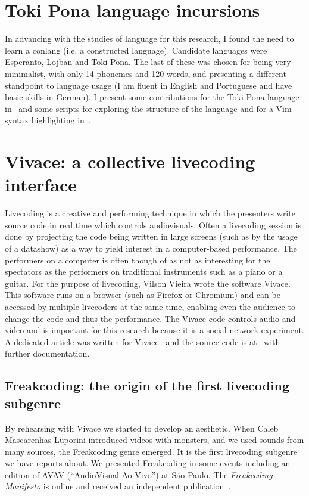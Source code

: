 \begin{apendicesenv}
\section{Toki Pona language incursions}
In advancing with the studies of language for this research,
I found the need to learn a conlang (i.e. a constructed language).
Candidate languages were Esperanto, Lojban and Toki Pona.
The last of these was chosen for being very minimalist,
with only 14 phonemes and 120 words,
and presenting a different standpoint to language usage
(I am fluent in English and Portuguese and have basic skills in German).
I present some contributions for the Toki Pona language in~\cite{tokiio}
and some scripts for exploring the structure of the language and for
a Vim syntax highlighting in~\cite{tokir}.

\section{Vivace: a collective livecoding interface}\label{sec:vivace}
Livecoding is a creative and performing technique in which the
presenters write source code in real time which controls audiovisuals.
Often a livecoding session is done by projecting the code being written in
large screens (such as by the usage of a datashow) as a way to yield
interest in a computer-based performance.
The performers on a computer is often though of as not as interesting
for the spectators as the performers on traditional instruments such as a piano or a guitar.
For the purpose of livecoding, Vilson Vieira wrote the software Vivace.
This software runs on a browser (such as Firefox or Chromium)
and can be accessed by multiple livecoders at the same time,
enabling even the audience to change the code and thus the performance.
The Vivace code controls audio and video and is important for
this research because it is a social network experiment.
A dedicated article was written for Vivace~\cite{vivacecmj}
and the source code is at~\cite{vivacecode} with further documentation.

\subsection{Freakcoding: the origin of the first livecoding subgenre}
By rehearsing with Vivace we started to develop an aesthetic.
When Caleb Mascarenhas Luporini introduced videos with monsters,
and we used sounds from many sources,
the Freakcoding genre emerged.
It is the first livecoding subgenre we have reports about.
We presented Freakcoding in some events including an edition
of AVAV (``AudioVisual Ao Vivo'') at São Paulo.
The \emph{Freakcoding Manifesto} is online and received
an independent publication~\cite{freakManifesto}.


\end{apendicesenv}

